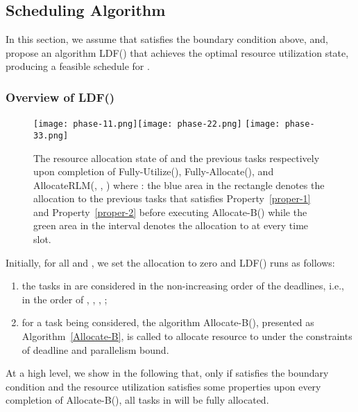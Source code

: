 \documentclass[10pt,journal,compsoc]{IEEEtran}
\begin{document}
\subsection{Scheduling Algorithm}
\label{sec.scheduling}


In this section, we assume that  satisfies the boundary condition above, and, propose an algorithm LDF() that achieves the optimal resource utilization state, producing a feasible schedule for .

\subsubsection{Overview of LDF()}
\label{sec.overview}






\begin{figure*}\centering
  \texttt{[image: phase-11.png]}\texttt{[image: phase-22.png]}
  \texttt{[image: phase-33.png]}

  \caption{The resource allocation state of  and the previous tasks  respectively upon completion of Fully-Utilize(), Fully-Allocate(), and AllocateRLM(, , ) where : the blue area in the rectangle denotes the allocation to the previous tasks that satisfies Property~\ref{proper-1} and Property~\ref{proper-2} before executing Allocate-B() while the green area in the interval  denotes the allocation to  at every time slot.}\label{Fig.5}
\end{figure*}








Initially, for all  and , we set the allocation  to zero and LDF() runs as follows:
\begin{enumerate}
 \setlength\itemsep{0.15em}
  \item the tasks in  are considered in the non-increasing order of the deadlines, i.e., in the order of , , , ;

  \item for a task  being considered, the algorithm Allocate-B(), presented as Algorithm~\ref{Allocate-B}, is called to allocate  resource to  under the constraints of deadline and parallelism bound.
\end{enumerate}

At a high level, we show in the following that, only if  satisfies the boundary condition and the resource utilization satisfies some properties upon every completion of Allocate-B(), all tasks in  will be fully allocated.
\end{document}
